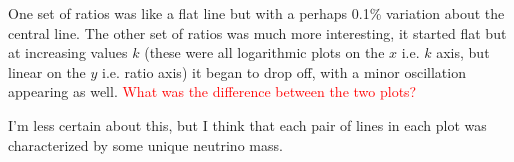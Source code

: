 \documentclass[11pt]{article}
\begin{document}
One set of ratios was like a flat line but with a perhaps 0.1\% variation about the central line. The other set of ratios was much more interesting, it started flat but at increasing values $k$ (these were all logarithmic plots on the $x$ i.e. $k$ axis, but linear on the $y$ i.e. ratio axis) it began to drop off, with a minor oscillation appearing as well. \textcolor{red}{What was the difference between the two plots?}

I'm less certain about this, but I think that each pair of lines in each plot was characterized by some unique neutrino mass.




\end{document}
